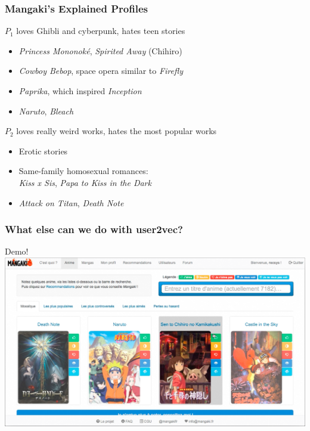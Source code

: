 \documentclass[]{beamer}
\begin{document}
\begin{frame}
    \frametitle{Mangaki's Explained Profiles}
    \begin{block}{$P_1$ loves Ghibli and cyberpunk, hates teen stories}
    \begin{itemize}
    \item[\good] \emph{Princess Mononoké}, \emph{Spirited Away} (Chihiro)
    \item[\good] \emph{Cowboy Bebop}, space opera similar to \emph{Firefly}
    \item[\good] \emph{Paprika}, which inspired \emph{Inception}
    \item[\bad] \emph{Naruto}, \emph{Bleach}
    \end{itemize}
    \end{block}
    \pause
    \begin{block}{$P_2$ loves really weird works, hates the most popular works}
    \begin{itemize}
    \item[\good] Erotic stories
    \item[\good] Same-family homosexual romances:\\\emph{Kiss x Sis}, \emph{Papa to Kiss in the Dark}
    \item[\bad] \emph{Attack on Titan}, \emph{Death Note}
    \end{itemize}
    \end{block}
\end{frame}

\begin{frame}
  \frametitle{What else can we do with user2vec?}
  \centering \Huge Demo!\vspace{5mm}
  \includegraphics[width=\linewidth]{figures/mangaki-screen.png}\\
\end{frame}
\end{document}
